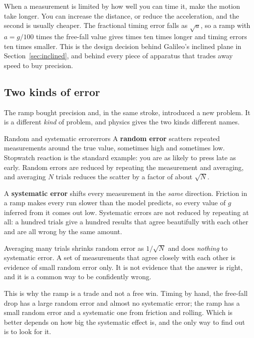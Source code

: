 \documentclass[11pt,twoside,openany]{book}
\begin{document}
\begin{keyidea}
When a measurement is limited by how well you can time it, make the motion take longer. You can increase the distance, or reduce the acceleration, and the second is usually cheaper. The fractional timing error falls as $\sqrt{a}$, so a ramp with $a = g/100$ times the free-fall value gives times ten times longer and timing errors ten times smaller. This is the design decision behind Galileo's inclined plane in Section~\ref{sec:inclined}, and behind every piece of apparatus that trades away speed to buy precision.
\end{keyidea}

\subsection{Two kinds of error}

The ramp bought precision and, in the same stroke, introduced a new problem. It is a different \emph{kind} of problem, and physics gives the two kinds different names.

\begin{definition}{Random and systematic error}{errors}
A \textbf{random error} scatters repeated measurements around the true value, sometimes high and sometimes low. Stopwatch reaction is the standard example: you are as likely to press late as early. Random errors are reduced by repeating the measurement and averaging, and averaging $N$ trials reduces the scatter by a factor of about $\sqrt{N}$.

A \textbf{systematic error} shifts every measurement in the \emph{same} direction. Friction in a ramp makes every run slower than the model predicts, so every value of $g$ inferred from it comes out low. Systematic errors are not reduced by repeating at all: a hundred trials give a hundred results that agree beautifully with each other and are all wrong by the same amount.
\end{definition}

\begin{keyidea}
Averaging many trials shrinks random error as $1/\sqrt{N}$ and does \emph{nothing} to systematic error. A set of measurements that agree closely with each other is evidence of small random error only. It is not evidence that the answer is right, and it is a common way to be confidently wrong.
\end{keyidea}

This is why the ramp is a trade and not a free win. Timing by hand, the free-fall drop has a large random error and almost no systematic error; the ramp has a small random error and a systematic one from friction and rolling. Which is better depends on how big the systematic effect is, and the only way to find out is to look for it.
\end{document}

